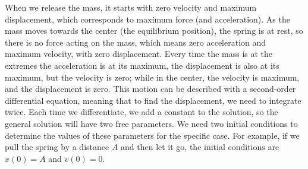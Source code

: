\documentclass[a4paper]{article}
\begin{document}
When we release the mass, it starts with zero velocity and maximum displacement, which corresponds to maximum force (and acceleration). As the mass moves towards the center (the equilibrium position), the spring is at rest, so there is no force acting on the mass, which means zero acceleration and maximum velocity, with zero displacement. Every time the mass is at the extremes the acceleration is at its maximum, the displacement is also at its maximum, but the velocity is zero; while in the center, the velocity is maximum, and the displacement is zero.  This motion can be described with a second-order differential equation, meaning that to find the displacement, we need to integrate twice. Each time we differentiate, we add a constant to the solution, so the general solution will have two free parameters. We need two initial conditions to determine the values of these parameters for the specific case. For example, if we pull the spring by a distance \( A \) and then let it go, the initial conditions are \( x(0) = A \) and \( v(0) = 0 \). 
\end{document}
